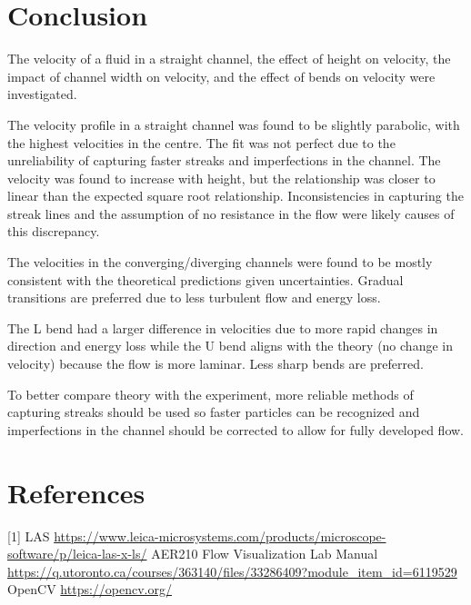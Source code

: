 \documentclass[12pt]{article}
\begin{document}
\section {Conclusion}
The velocity of a fluid in a straight channel, the effect of height on velocity, the impact of channel width on velocity, and the effect of bends on velocity were investigated. 

The velocity profile in a straight channel was found to be slightly parabolic, with the highest velocities in the centre. The fit was not perfect due to the unreliability of capturing faster streaks and imperfections in the channel. 
The velocity was found to increase with height, but the relationship was closer to linear than the expected square root relationship. Inconsistencies in capturing the streak lines and the assumption of no resistance in the flow were likely causes of this discrepancy.

The velocities in the converging/diverging channels were found to be mostly consistent with the theoretical predictions given uncertainties. Gradual transitions are preferred due to less turbulent flow and energy loss.

The L bend had a larger difference in velocities due to more rapid changes in direction and energy loss while the U bend aligns with the theory (no change in velocity) because the flow is more laminar. Less sharp bends are preferred.

To better compare theory with the experiment, more reliable methods of capturing streaks should be used so faster particles can be recognized and imperfections in the channel should be corrected to allow for fully developed flow.
\section {References}
[1] LAS \url{https://www.leica-microsystems.com/products/microscope-software/p/leica-las-x-ls/} \newline
[2] AER210 Flow Visualization Lab Manual \url{https://q.utoronto.ca/courses/363140/files/33286409?module_item_id=6119529} \newline
[3] OpenCV \url{https://opencv.org/}
\end{document}
